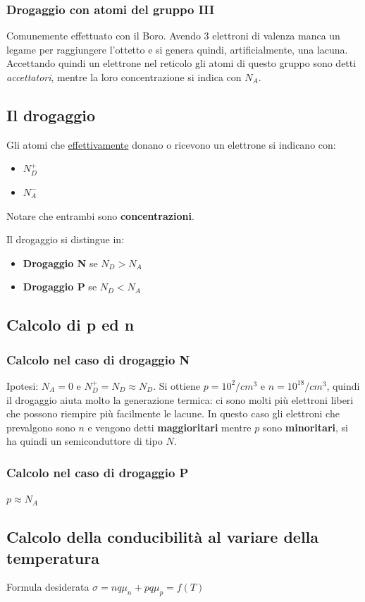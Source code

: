 \documentclass[11pt,a4paper,]{article}
\begin{document}
\subsubsection{Drogaggio con atomi del gruppo III}
Comunemente effettuato con il Boro.
Avendo 3 elettroni di valenza manca un legame per raggiungere l'ottetto e si genera quindi, artificialmente, una lacuna.
Accettando quindi un elettrone nel reticolo gli atomi di questo gruppo sono detti \textit{accettatori}, mentre la loro concentrazione si indica con $N_A$.
\subsection{Il drogaggio}
Gli atomi che \underline{effettivamente} donano o ricevono un elettrone si indicano con:
\begin{itemize}
    \item $N_D^+$
    \item $N_A^-$
\end{itemize}
Notare che entrambi sono \textbf{concentrazioni}.

Il drogaggio si distingue in:
\begin{itemize}
    \item \textbf{Drogaggio N} se $N_D > N_A$
    \item \textbf{Drogaggio P} se $N_D < N_A$
\end{itemize}
\subsection{Calcolo di p ed n}
\subsubsection{Calcolo nel caso di drogaggio N}
Ipotesi: $N_A = 0$ e $N_D^+=N_D\approx N_D$.
Si ottiene $p = 10^2/cm^3$ e $n = 10^{18}/cm^3$, quindi il drogaggio aiuta molto la generazione termica: ci sono molti più elettroni liberi che possono riempire più facilmente le lacune.
In questo caso gli elettroni che prevalgono sono $n$ e vengono detti \textbf{maggioritari} mentre $p$ sono \textbf{minoritari}, si ha quindi un semiconduttore di tipo $N$.

\subsubsection{Calcolo nel caso di drogaggio P}
$p \approx N_A$

\subsection{Calcolo della conducibilità al variare della temperatura}
Formula desiderata $\sigma = nq\mu_n + pq\mu_p = f(T)$
\end{document}

